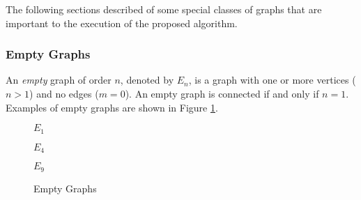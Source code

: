 The following sections described of some special classes of graphs that are important to the execution of the
proposed algorithm.

\subsubsection{Empty Graphs}

An \emph{empty} graph of order \(n\), denoted by \(E_n\), is a graph with one or more vertices (\(n>1\)) and no
edges (\(m=0\)).  An empty graph is connected if and only if \(n=1\).  Examples of empty graphs are shown in Figure
\ref{fig:empty}.

\begin{figure}[h]
  \label{fig:empty}
  \begin{minipage}{1.5in}
    \begin{center}

      \bigskip

      \(E_1\)
    \end{center}
  \end{minipage}
  \begin{minipage}{2.5in}
    \begin{center}

      \bigskip

      \(E_4\)
    \end{center}
  \end{minipage}
  \begin{minipage}{2in}
    \begin{center}

      \bigskip

      \(E_9\)
    \end{center}
  \end{minipage}
  \caption{Empty Graphs}
\end{figure}

